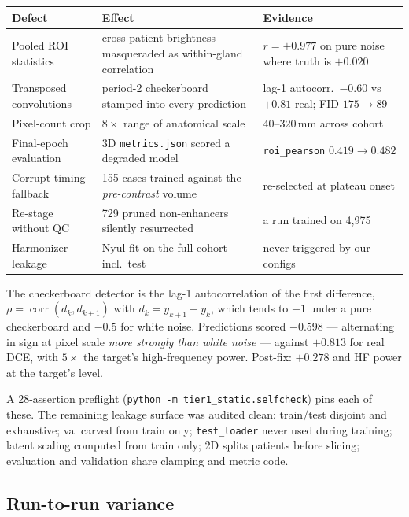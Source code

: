 \documentclass[11pt]{article}
\newcommand{\1}{\mathbb{1}}
\begin{document}
\begin{center}
\small
\begin{tabular}{p{3.4cm}p{7.2cm}p{3.4cm}}
\toprule
Defect & Effect & Evidence \\
\midrule
Pooled ROI statistics & cross-patient brightness masqueraded as within-gland correlation & $r=+0.977$ on pure noise where truth is $+0.020$ \\
Transposed convolutions & period-2 checkerboard stamped into every prediction & lag-1 autocorr.\ $-0.60$ vs $+0.81$ real; FID $175\to89$ \\
Pixel-count crop & $8\times$ range of anatomical scale & $40$--$320$\,mm across cohort \\
Final-epoch evaluation & 3D \texttt{metrics.json} scored a degraded model & \texttt{roi\_pearson} $0.419\to0.482$ \\
Corrupt-timing fallback & 155 cases trained against the \emph{pre-contrast} volume & re-selected at plateau onset \\
Re-stage without QC & 729 pruned non-enhancers silently resurrected & a run trained on 4{,}975 \\
Harmonizer leakage & Nyul fit on the full cohort incl.\ test & never triggered by our configs \\
\bottomrule
\end{tabular}
\end{center}

The checkerboard detector is the lag-1 autocorrelation of the first difference,
$\rho=\operatorname{corr}(d_k,d_{k+1})$ with $d_k=y_{k+1}-y_k$, which tends to $-1$ under a
pure checkerboard and $-0.5$ for white noise. Predictions scored $\mathbf{-0.598}$ ---
alternating in sign at pixel scale \emph{more strongly than white noise} --- against
$+0.813$ for real DCE, with $5\times$ the target's high-frequency power. Post-fix: $+0.278$
and HF power at the target's level.

A 28-assertion preflight (\texttt{python -m tier1\_static.selfcheck}) pins each of these.
The remaining leakage surface was audited clean: train/test disjoint and exhaustive; val
carved from train only; \texttt{test\_loader} never used during training; latent scaling
computed from train only; 2D splits patients before slicing; evaluation and validation share
clamping and metric code.

\subsection{Run-to-run variance}
\label{sec:variance}
\end{document}
